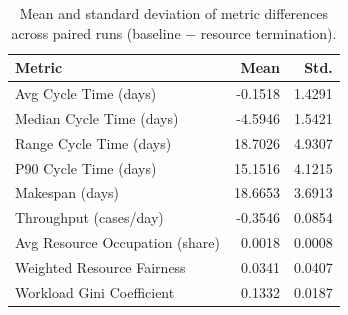 \begin{table}[t]
\centering
\scriptsize
\caption{Mean and standard deviation of metric differences across paired runs (baseline $-$ resource termination).}
\label{tab:termination-comparison}
\begin{tabular}{lrr}
\toprule
\textbf{Metric} & \textbf{Mean} & \textbf{Std.} \\
\midrule
Avg Cycle Time (days) & -0.1518 & 1.4291 \\
Median Cycle Time (days) & -4.5946 & 1.5421 \\
Range Cycle Time (days) & 18.7026 & 4.9307 \\
P90 Cycle Time (days) & 15.1516 & 4.1215 \\
Makespan (days) & 18.6653 & 3.6913 \\
Throughput (cases/day) & -0.3546 & 0.0854 \\
Avg Resource Occupation (share) & 0.0018 & 0.0008 \\
Weighted Resource Fairness & 0.0341 & 0.0407 \\
Workload Gini Coefficient & 0.1332 & 0.0187 \\
\bottomrule
\end{tabular}
\end{table}
